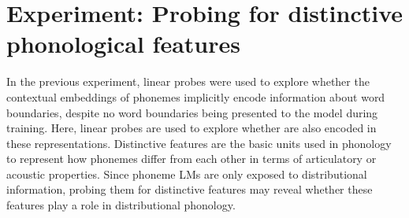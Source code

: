 
\section{Experiment: Probing for distinctive phonological features}\label{sec:15-featureprobing}

In the previous experiment, linear probes were used to explore whether the contextual embeddings of phonemes implicitly encode information about word boundaries, despite no word boundaries being presented to the model during training. Here, linear probes are used to explore whether  are also encoded in these representations. Distinctive features are the basic units used in phonology to represent how phonemes differ from each other in terms of articulatory or acoustic properties. Since phoneme LMs are only exposed to distributional information, probing them for distinctive features may reveal whether these features play a role in distributional phonology. 

